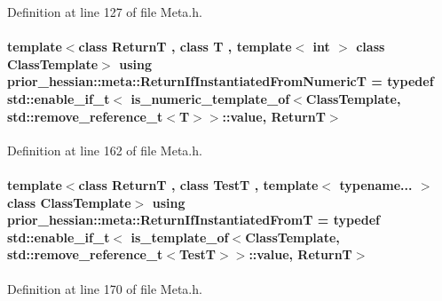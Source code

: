 Definition at line 127 of file Meta.\+h.

\paragraph[{\texorpdfstring{Return\+If\+Instantiated\+From\+NumericT}{ReturnIfInstantiatedFromNumericT}}]{\setlength{\rightskip}{0pt plus 5cm}template$<$class ReturnT , class T , template$<$ int $>$ class Class\+Template$>$ using {\bf prior\+\_\+hessian\+::meta\+::\+Return\+If\+Instantiated\+From\+NumericT} = typedef std\+::enable\+\_\+if\+\_\+t$<$ {\bf is\+\_\+numeric\+\_\+template\+\_\+of}$<$Class\+Template, std\+::remove\+\_\+reference\+\_\+t$<$T$>$$>$\+::value, ReturnT$>$}\hypertarget{namespaceprior__hessian_1_1meta_a408d81bee769664002f490e4a08b9944}{}\label{namespaceprior__hessian_1_1meta_a408d81bee769664002f490e4a08b9944}


Definition at line 162 of file Meta.\+h.

\paragraph[{\texorpdfstring{Return\+If\+Instantiated\+FromT}{ReturnIfInstantiatedFromT}}]{\setlength{\rightskip}{0pt plus 5cm}template$<$class ReturnT , class TestT , template$<$ typename... $>$ class Class\+Template$>$ using {\bf prior\+\_\+hessian\+::meta\+::\+Return\+If\+Instantiated\+FromT} = typedef std\+::enable\+\_\+if\+\_\+t$<$ {\bf is\+\_\+template\+\_\+of}$<$Class\+Template, std\+::remove\+\_\+reference\+\_\+t$<$TestT$>$$>$\+::value, ReturnT$>$}\hypertarget{namespaceprior__hessian_1_1meta_ab7bb340f7fc79b7a874c3d407fca091d}{}\label{namespaceprior__hessian_1_1meta_ab7bb340f7fc79b7a874c3d407fca091d}


Definition at line 170 of file Meta.\+h.

